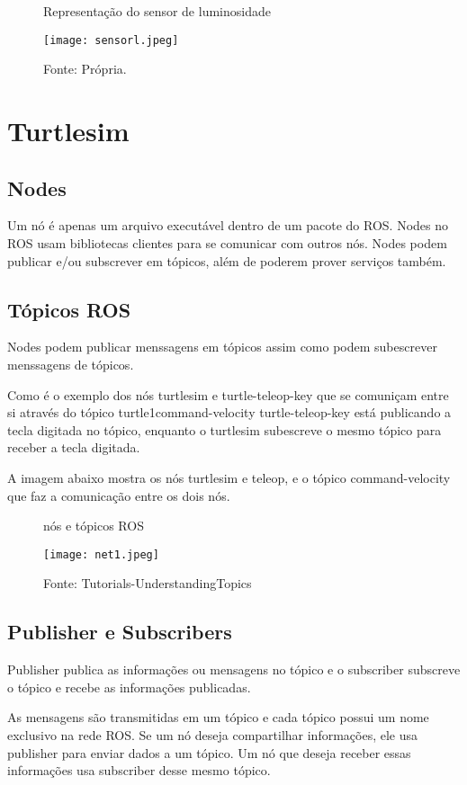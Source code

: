\begin{figure} [h!]	
   \centering
   \caption{Representação do sensor de luminosidade}
   \texttt{[image: sensorl.jpeg]}
   \caption*{Fonte: Própria.}
   \label{fig:sensorluminosidade}
\end{figure}	

\section{Turtlesim}
\subsection{Nodes}
Um nó é apenas um arquivo executável dentro de um pacote do ROS. Nodes no ROS usam bibliotecas clientes para se comunicar com outros nós.
Nodes podem publicar e/ou subscrever em tópicos, além de poderem prover serviços também.\cite{WikiROS}
\subsection{Tópicos ROS}
Nodes podem publicar menssagens em tópicos assim como podem subescrever menssagens de tópicos.\cite{WikiROS}

Como é o exemplo dos nós turtlesim e turtle-teleop-key que se comuniçam entre si através do tópico turtle1command-velocity
turtle-teleop-key está publicando a tecla digitada no tópico, enquanto o turtlesim subescreve o mesmo tópico para receber a tecla digitada. \cite{WikiROS}

A imagem abaixo mostra os nós turtlesim e teleop, e o tópico command-velocity que faz a comunicação entre os dois nós.

\begin{figure} [h!]	
   \centering
   \caption{nós e tópicos ROS}
   \texttt{[image: net1.jpeg]}
   \caption*{Fonte: Tutorials-UnderstandingTopics}
   \label{fig:nosetopicos}
\end{figure}	
\subsection{Publisher e Subscribers}

Publisher publica as informações ou mensagens no tópico e o subscriber subscreve o tópico e recebe as informações publicadas.\cite{WikiROS}

As mensagens são transmitidas em um tópico e cada tópico possui um nome exclusivo na rede ROS. Se um nó deseja compartilhar informações,
ele usa publisher para enviar dados a um tópico. Um nó que deseja receber essas informações usa subscriber desse mesmo tópico. \cite{WikiROS}

